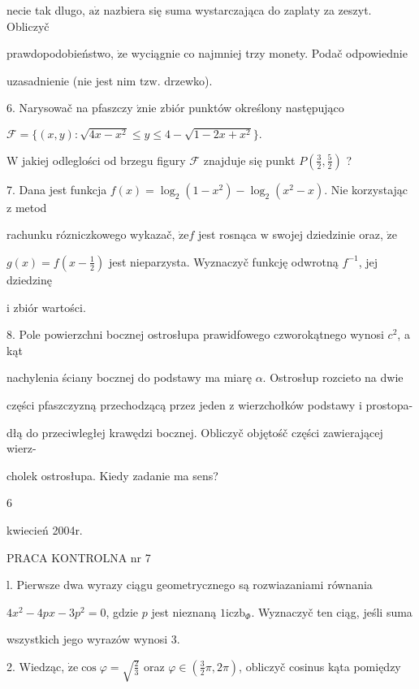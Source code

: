\documentclass[a4paper,12pt]{article}
\begin{document}
necie tak dlugo, $\mathrm{a}\dot{\mathrm{z}}$ nazbiera się suma wystarczająca do zaplaty za zeszyt. Obliczyč

prawdopodobieństwo, $\dot{\mathrm{z}}\mathrm{e}$ wyciągnie co najmniej trzy monety. Podač odpowiednie

uzasadnienie (nie jest nim $\mathrm{t}\mathrm{z}\mathrm{w}$. drzewko).

6. Narysowač na pfaszczy $\acute{\mathrm{z}}\mathrm{n}\mathrm{i}\mathrm{e}$ zbiór punktów określony następująco

$\mathcal{F}=\{(x,y):\sqrt{4x-x^{2}}\leq y\leq 4-\sqrt{1-2x+x^{2}}\}.$

$\mathrm{W}$ jakiej odleglości od brzegu figury $\mathcal{F}$ znajduje się punkt $P(\displaystyle \frac{3}{2},\frac{5}{2})$ ?

7. Dana jest funkcja $f(x) = \log_{2}(1-x^{2})-\log_{2}(x^{2}-x)$. Nie korzystając $\mathrm{z}$ metod

rachunku rózniczkowego wykazač, $\dot{\mathrm{z}}\mathrm{e}f$ jest rosnąca $\mathrm{w}$ swojej dziedzinie oraz, $\dot{\mathrm{z}}\mathrm{e}$

$g(x)=f(x-\displaystyle \frac{1}{2})$ jest nieparzysta. Wyznaczyč funkcję odwrotną $f^{-1}$, jej dziedzinę

$\mathrm{i}$ zbiór wartości.

8. Pole powierzchni bocznej ostrosłupa prawidfowego czworokątnego wynosi $c^{2}$, a kąt

nachylenia ściany bocznej do podstawy ma miarę $\alpha$. Ostrosłup rozcieto na dwie

części pfaszczyzną przechodzącą przez jeden $\mathrm{z}$ wierzchołków podstawy $\mathrm{i}$ prostopa-

dłą do przeciwległej krawędzi bocznej. Obliczyč objętośč części zawierającej wierz-

cholek ostrosłupa. Kiedy zadanie ma sens?

6





kwiecień 2004r.

PRACA KONTROLNA nr 7

l. Pierwsze dwa wyrazy ciągu geometrycznego są rozwiazaniami równania

$4x^{2}-4px-3p^{2}=0$, gdzie $p$ jest nieznaną $1\mathrm{i}\mathrm{c}\mathrm{z}\mathrm{b}_{\Phi}$. Wyznaczyč ten ciąg, jeśli suma

wszystkich jego wyrazów wynosi 3.

2. Wiedząc, $\dot{\mathrm{z}}\mathrm{e} \cos\varphi = \sqrt{\frac{2}{3}}$ oraz $\varphi \in (\displaystyle \frac{3}{2}\pi,2\pi)$, obliczyč cosinus kąta pomiędzy
\end{document}
